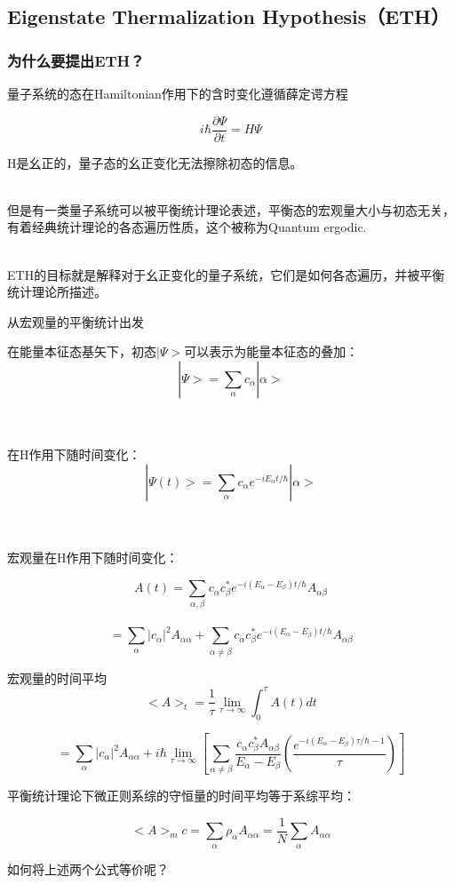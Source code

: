 \documentclass{beamer}
\begin{document}
\subsection{Eigenstate Thermalization Hypothesis（ETH）}
\begin{frame}
\frametitle{为什么要提出ETH？}
量子系统的态在Hamiltonian作用下的含时变化遵循薛定谔方程

$$ i \hbar\frac{\partial \Psi}{\partial t}=H\Psi$$

\pause H是幺正的，量子态的幺正变化无法擦除初态的信息。
\\~

\pause 但是有一类量子系统可以被平衡统计理论表述，平衡态的宏观量大小与初态无关，有着经典统计理论的各态遍历性质，这个被称为Quantum ergodic.
\\~

\pause ETH的目标就是解释对于幺正变化的量子系统，它们是如何各态遍历，并被平衡统计理论所描述。

\end{frame}

\begin{frame}{从宏观量的平衡统计出发}

在能量本征态基矢下，初态$|\Psi>$可以表示为能量本征态的叠加：
$$|\Psi>=\sum_{\alpha}c_{\alpha}|\alpha>$$
\\~

在H作用下随时间变化：
$$|\Psi(t)>=\sum_{\alpha}c_{\alpha}e^{-i E_\alpha t/\hbar}|\alpha>$$
\\~

宏观量在H作用下随时间变化：


$$A(t)=\sum_{\alpha,\beta}c_{\alpha}c_{\beta}^{*}e^{-i(E_\alpha-E_\beta) t/\hbar}A_{\alpha \beta}$$\\

$$=\sum_{\alpha}|c_{\alpha}|^{2}A_{\alpha \alpha}+\sum_{\alpha \ne \beta}c_{\alpha}c_{\beta}^{*}e^{-i(E_\alpha-E_\beta) t/\hbar}A_{\alpha \beta}$$
\end{frame}

\begin{frame}
宏观量的时间平均
$$<A>_t=\frac{1}{\tau}\lim_{\tau \to \infty}\int_{0}^{\tau}A(t)dt $$

$$=\sum_{\alpha}|c_{\alpha}|^{2}A_{\alpha \alpha}+i\hbar\lim_{\tau\to \infty}[\sum_{\alpha\ne\beta}\frac{c_{\alpha}c_{\beta}^{*}A_{\alpha \beta}}{E_\alpha-E_\beta}(\frac{e^{-i(E_\alpha-E_\beta)\tau/\hbar-1}}{\tau})]$$

平衡统计理论下微正则系综的守恒量的时间平均等于系综平均：

$$<A>_mc=\sum_{\alpha}{\rho_\alpha A_{\alpha\alpha}}=\frac{1}{N}\sum_{\alpha}{A_{\alpha\alpha}}$$

\pause 如何将上述两个公式等价呢？

\end{frame}
\end{document}
